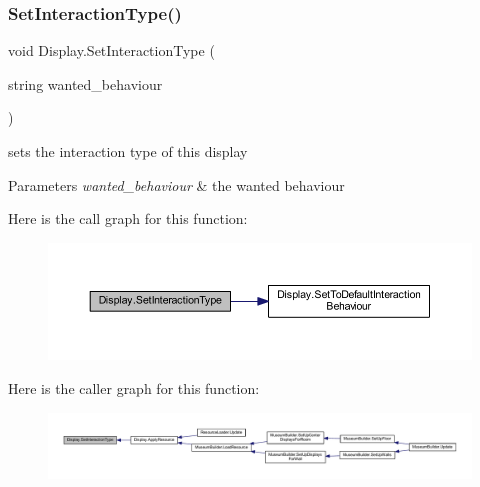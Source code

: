 \subsubsection{\texorpdfstring{Set\+Interaction\+Type()}{SetInteractionType()}}
{\footnotesize\ttfamily void Display.\+Set\+Interaction\+Type (\begin{DoxyParamCaption}\item[{string}]{wanted\+\_\+behaviour }\end{DoxyParamCaption})\hspace{0.3cm}{\ttfamily [private]}}



sets the interaction type of this display 


\begin{DoxyParams}{Parameters}
{\em wanted\+\_\+behaviour} & the wanted behaviour\\
\hline
\end{DoxyParams}
Here is the call graph for this function\+:
\nopagebreak
\begin{figure}[H]
\begin{center}
\leavevmode
\includegraphics[width=350pt]{class_display_af8aa8a663725645f431095397ad802e6_cgraph}
\end{center}
\end{figure}
Here is the caller graph for this function\+:
\nopagebreak
\begin{figure}[H]
\begin{center}
\leavevmode
\includegraphics[width=350pt]{class_display_af8aa8a663725645f431095397ad802e6_icgraph}
\end{center}
\end{figure}
\mbox{\label{class_display_a81f07350cf50b3924f4fe269e1b4cf17}} 
